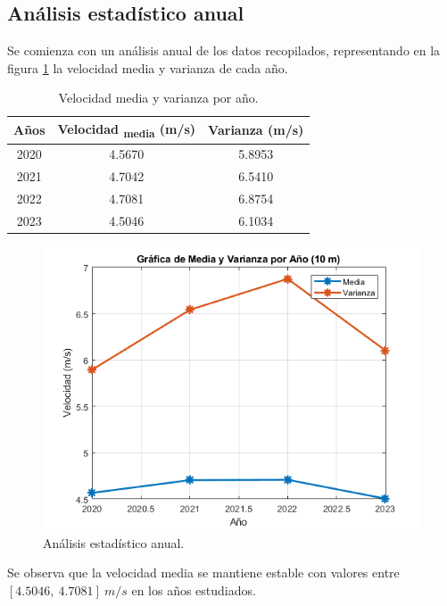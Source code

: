 \documentclass{IEEEtran}
\begin{document}

\subsection{Análisis estadístico anual}

Se comienza con un análisis anual de los datos recopilados, representando en la figura \ref{fig: Analisis estadistico anual} la velocidad media y varianza de cada año.

\begin{table}[h]
    \centering
    \label{tab: Velocidad media y varianza por año}
    \caption{Velocidad media y varianza por año.}
    \begin{tabular}{|c|c|c|}
        \hline
        Años & Velocidad \textsubscript{media} (m/s) & Varianza (m/s) \\
        \hline
        2020 & 4.5670 & 5.8953 \\
        2021 & 4.7042 & 6.5410 \\
        2022 & 4.7081 & 6.8754 \\
        2023 & 4.5046 & 6.1034 \\
        \hline
    \end{tabular}
\end{table}

\begin{figure}[h]
    \centering
    \includegraphics[width = 0.5 \textwidth]{Imagenes/Grafica de Media y Varianza por Año.png}
    \caption{Análisis estadístico anual.}
    \label{fig: Analisis estadistico anual}
\end{figure}

Se observa que la velocidad media se mantiene estable con valores entre $[4.5046,\ 4.7081]\ m/s$ en los años estudiados.
\end{document}

